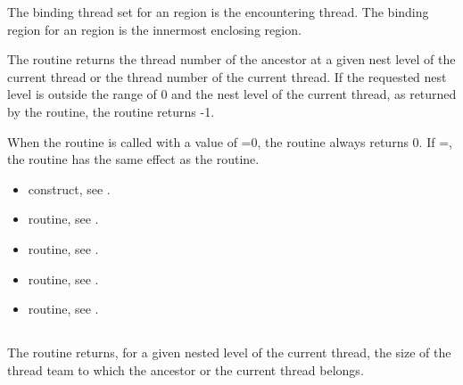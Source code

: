 \binding
The binding thread set for an  region is the
encountering thread. The binding region for an 
region is the innermost enclosing  region.

\effect
The  routine returns the thread number of the
ancestor at a given nest level of the current thread or the thread number of the current
thread. If the requested nest level is outside the range of 0 and the nest level of the
current thread, as returned by the  routine, the routine returns -1.

\begin{note}
When the  routine is called with a value
of =0, the routine always returns 0. If =, the routine
has the same effect as the  routine.
\end{note}

\crossreferences
\begin{itemize}
\item {} construct, see
.

\item {} routine, see
.

\item {} routine, see
.

\item {} routine, see
.

\item {} routine, see
.
\end{itemize}










\subsection{}
\label{subsec:omp_get_team_size}
\summary
The  routine returns, for a given nested level of the current
thread, the size of the thread team to which the ancestor or the current thread belongs.

